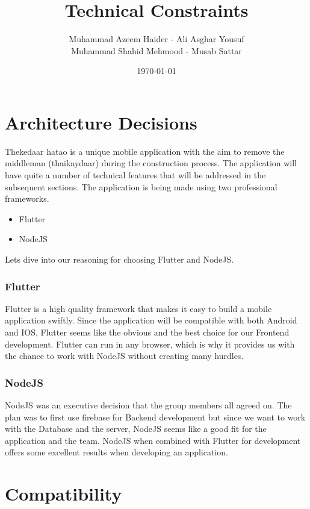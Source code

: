 \documentclass[12pt]{report}
\title{Technical Constraints}
\author{Muhammad Azeem Haider - Ali Asghar Yousuf \\
        Muhammad Shahid Mehmood - Musab Sattar}
\date{\today}
\begin{document}
\maketitle

\newpage

\section*{Architecture Decisions}

Thekedaar hatao is a unique mobile application with the aim to remove the middleman (thaikaydaar) during the construction process.
The application will have quite a number of technical features that will be addressed in the subsequent sections. The application is being made using two professional frameworks. 

\begin{itemize}

        \item Flutter 
        \item NodeJS

\end{itemize}

Lets dive into our reasoning for choosing Flutter and NodeJS. 

\subsubsection*{Flutter}

Flutter is a high quality framework that makes it easy to build a mobile application swiftly. Since the application will be compatible with both Android and IOS,
Flutter seems like the obvious and the best choice for our Frontend development. Flutter can run in any browser, which is why it provides us with the chance to work with NodeJS without creating many hurdles.  

\subsubsection*{NodeJS}

NodeJS was an executive decision that the group members all agreed on. The plan was to first use firebase for Backend development but since we want to work with the Database and the server, 
NodeJS seems like a good fit for the application and the team. NodeJS when combined with Flutter for development offers some excellent results when developing an application. 

\section*{Compatibility}
\end{document}
